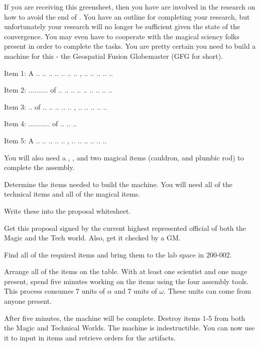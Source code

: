 \documentclass[green]{guildcamp3}
\begin{document}
\name{\gSaveTheWorldScientists{}}

If you are receiving this greensheet, then you have are involved in the research on how to avoid the end of \bTechWorld{}. You have an outline for completing your research, but unfortunately your research will no longer be sufficient given the state of the convergence. You may even have to cooperate with the magical sciency folks present in order to complete the tasks. You are pretty certain you need to build a machine for this - the Geospatial Fusion Globemaster (GFG for short). 

Item 1: A .. .. .. .. .. .. .. , .. .. .. .. ..

Item 2: .......... of .. .. .. .. .. .. .. .. ..

Item 3: .. of .. .. .. .. ..  ,  .. .. .. .. ..

Item 4: ........... of .. .. .. 

Item 5: A .. .. .. .. ..  ,  .. .. .. .. .. ..

You will also need a \iMultitool{}, \iScrewdriver{}, and two magical items (cauldron, and plumbic rod) to complete the assembly. 


\begin{enum}[Directions]
	\item Determine the items needed to build the machine. You will need all of the technical items and all of the magical items. 
	\item Write these into the proposal whitesheet. 
	\item Get this proposal signed by the current highest represented official of both the Magic and the Tech world. Also, get it checked by a GM.
	\item Find all of the required items and bring them to the lab space in 200-002.
	\item Arrange all of the items on the table. With at least one scientist and one mage present, spend five minutes working on the items using the four assembly tools. This process consumes 7 units of $\alpha$ and 7 units of $\omega$. These units can come from anyone present. 
	\item After five minutes, the machine will be complete. Destroy items 1-5 from both the Magic and Technical Worlds. The machine is indestructible. You can now use it to input in items and retrieve orders for the artifacts. 
	
\end{enum}
\end{document}
